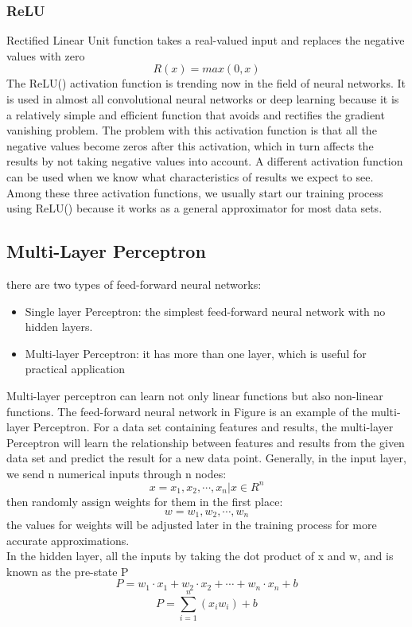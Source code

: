 \subsubsection{ReLU} Rectified Linear Unit function takes a real-valued input and replaces the negative values with zero
$$R(x) = max(0,x)$$
The ReLU() activation function is trending now in the field of neural networks. It is used in almost all convolutional neural networks or deep learning because it is a relatively simple and efficient function that avoids and rectifies the gradient vanishing problem. The problem with this activation function is that all the negative values become zeros after this activation, which in turn affects the results by not taking negative values into account. A different activation function can be used when we know what characteristics of results we expect to see. Among these three activation functions, we usually start our training process using ReLU() because it works as a general approximator for most data sets.

\subsection{ Multi-Layer Perceptron} there are two types of feed-forward neural networks:
\begin{itemize}
    \item Single layer Perceptron: the simplest feed-forward neural network with no hidden layers.
    \item Multi-layer Perceptron: it has more than one layer, which is useful for practical application
\end{itemize}

Multi-layer perceptron can learn not only linear functions but also non-linear functions. The feed-forward neural network in Figure is an example of the multi-layer Perceptron. For a data set containing features and results, the multi-layer Perceptron will learn the relationship between features and results from the given data set and predict the result for
a new data point. Generally, in the input layer, we send n numerical inputs through n nodes:$$ x = x_{1},x_{2},\cdots,x_{n} |x\in R^{n}$$
then randomly assign weights for them in the first place: $$w = w_{1},w_{2},\cdots,w_{n}$$ the values for weights will be adjusted later in the training process for more accurate approximations.\\
In the hidden layer, all the inputs by taking the dot product of x and w, and is known as the pre-state P
$$P = w_{1}\cdot x_{1}+w_{2}\cdot x_{2}+\cdots+w_{n}\cdot x_{n}+b$$
$$ P = \sum^{n}_{i=1}(x_{i}w_{i}) + b$$

